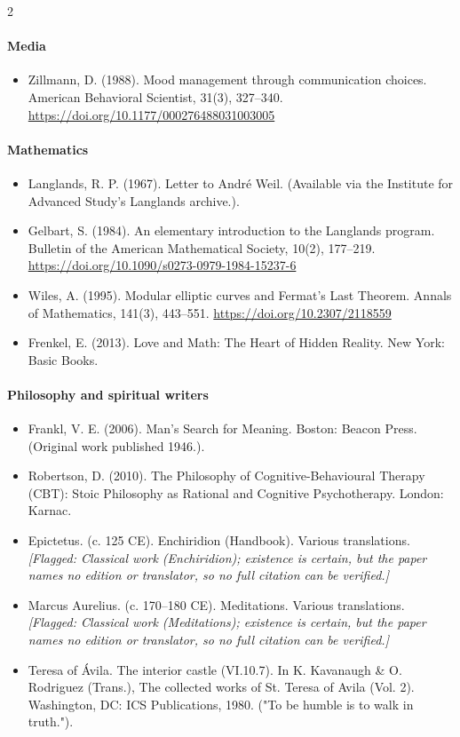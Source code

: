 \documentclass[10pt]{article}
\theoremstyle{definition}
\theoremstyle{remark}
\begin{document}
\begin{multicols}{2}
\paragraph{Media}
\begin{itemize}[leftmargin=1em,itemsep=0pt,topsep=1pt,parsep=0pt]
\item Zillmann, D. (1988). Mood management through communication choices. American Behavioral Scientist, 31(3), 327--340. \url{https://doi.org/10.1177/000276488031003005}
\end{itemize}
\paragraph{Mathematics}
\begin{itemize}[leftmargin=1em,itemsep=0pt,topsep=1pt,parsep=0pt]
\item Langlands, R. P. (1967). Letter to André Weil. (Available via the Institute for Advanced Study's Langlands archive.).
\item Gelbart, S. (1984). An elementary introduction to the Langlands program. Bulletin of the American Mathematical Society, 10(2), 177--219. \url{https://doi.org/10.1090/s0273-0979-1984-15237-6}
\item Wiles, A. (1995). Modular elliptic curves and Fermat's Last Theorem. Annals of Mathematics, 141(3), 443--551. \url{https://doi.org/10.2307/2118559}
\item Frenkel, E. (2013). Love and Math: The Heart of Hidden Reality. New York: Basic Books.
\end{itemize}
\paragraph{Philosophy and spiritual writers}
\begin{itemize}[leftmargin=1em,itemsep=0pt,topsep=1pt,parsep=0pt]
\item Frankl, V. E. (2006). Man's Search for Meaning. Boston: Beacon Press. (Original work published 1946.).
\item Robertson, D. (2010). The Philosophy of Cognitive-Behavioural Therapy (CBT): Stoic Philosophy as Rational and Cognitive Psychotherapy. London: Karnac.
\item Epictetus. (c. 125 CE). Enchiridion (Handbook). Various translations. \textit{[Flagged: Classical work (Enchiridion); existence is certain, but the paper names no edition or translator, so no full citation can be verified.]}
\item Marcus Aurelius. (c. 170--180 CE). Meditations. Various translations. \textit{[Flagged: Classical work (Meditations); existence is certain, but the paper names no edition or translator, so no full citation can be verified.]}
\item Teresa of Ávila. The interior castle (VI.10.7). In K. Kavanaugh \& O. Rodriguez (Trans.), The collected works of St. Teresa of Avila (Vol. 2). Washington, DC: ICS Publications, 1980. ("To be humble is to walk in truth.").
\end{itemize}

\end{multicols}
\end{document}
